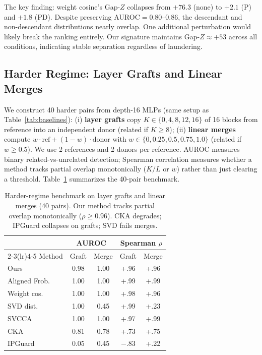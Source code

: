 The key finding: weight cosine's Gap-$Z$ collapses from $+76.3$ (none) to $+2.1$ (P) and $+1.8$ (PD). Despite preserving AUROC$=$0.80--0.86, the descendant and non-descendant distributions nearly overlap. One additional perturbation would likely break the ranking entirely. Our signature maintains Gap-$Z \approx +53$ across all conditions, indicating stable separation regardless of laundering.

\subsection{Harder Regime: Layer Grafts and Linear Merges}\label{app:harder-bench}

We construct 40 harder pairs from depth-16 MLPs (same setup as Table~\ref{tab:baselines}): (i) \textbf{layer grafts} copy $K \in \{0,4,8,12,16\}$ of 16 blocks from reference into an independent donor (related if $K \ge 8$); (ii) \textbf{linear merges} compute $w \cdot \mathrm{ref} + (1-w) \cdot \mathrm{donor}$ with $w \in \{0, 0.25, 0.5, 0.75, 1.0\}$ (related if $w \ge 0.5$). We use 2 references and 2 donors per reference. AUROC measures binary related-vs-unrelated detection; Spearman correlation measures whether a method tracks partial overlap monotonically ($K/L$ or $w$) rather than just clearing a threshold. Table~\ref{tab:harder-bench} summarizes the 40-pair benchmark.

\begin{table}[h]
\centering\small
\setlength{\tabcolsep}{2pt}
\begin{tabular}{@{}lcccc@{}}
\toprule
& \multicolumn{2}{c}{AUROC} & \multicolumn{2}{c}{Spearman $\rho$} \\
\cmidrule(lr){2-3}\cmidrule(lr){4-5}
Method & Graft & Merge & Graft & Merge \\
\midrule
Ours  & 0.98 & 1.00 & +.96 & +.96 \\
Aligned Frob.\ & 1.00 & 1.00 & +.99 & +.99 \\
Weight cos.\ & 1.00 & 1.00 & +.98 & +.96 \\
SVD dist.\ & 1.00 & 0.45 & +.99 & +.23 \\
SVCCA & 1.00 & 1.00 & +.97 & +.99 \\
CKA & 0.81 & 0.78 & +.73 & +.75 \\
IPGuard & 0.05 & 0.45 & $-$.83 & +.22 \\
\bottomrule
\end{tabular}
\caption{Harder-regime benchmark on layer grafts and linear merges (40 pairs). Our method tracks partial overlap monotonically ($\rho \ge 0.96$). CKA degrades; IPGuard collapses on grafts; SVD fails merges.}
\label{tab:harder-bench}
\end{table}

